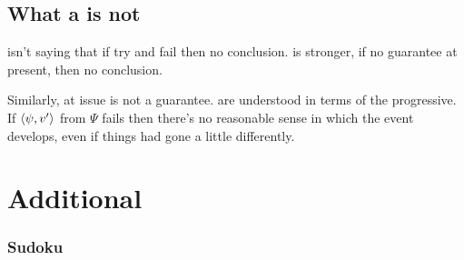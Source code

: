 \subsection{What a \requ{} is not}

\begin{note}
  \requ{} isn't saying that if try and fail then no conclusion.
  \requ{} is stronger, if no guarantee at present, then no conclusion.
\end{note}

\begin{note}
  Similarly, at issue is not a guarantee.
   are understood in terms of the progressive.
  If \(\langle \psi, v' \rangle\) from \(\Psi\) fails then there's no reasonable sense in which the event develops, even if things had gone a little differently.
\end{note}

\section{Additional }
\label{cha:requs:sec:add-illu}

\subsubsection{Sudoku}
\label{sec:sudoku}


